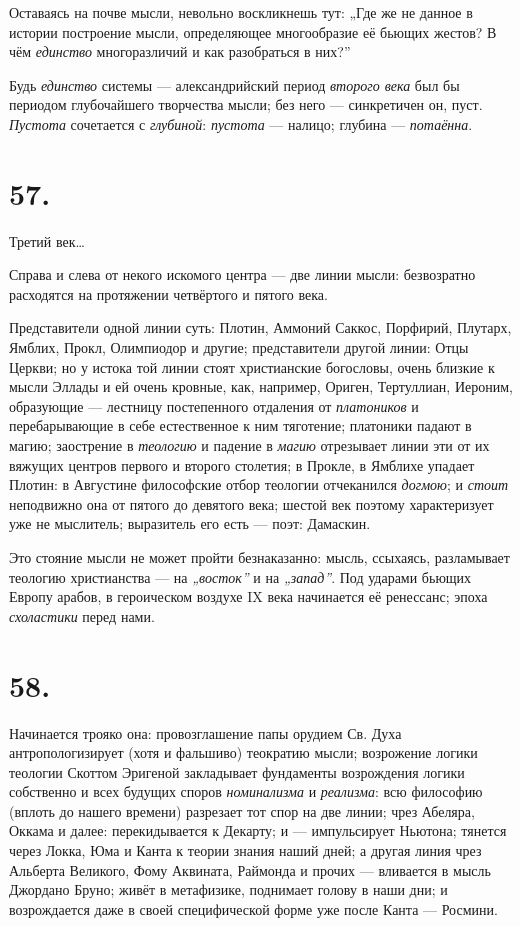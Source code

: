 \documentclass[12pt,a4paper,oneside]{book}
\begin{document}
Оставаясь на почве мысли, невольно воскликнешь тут: „Где же не данное в истории построение мысли, определяющее многообразие её бьющих жестов? В чём \emph{единство} многоразличий и как разобраться в них?”

Будь \emph{единство} системы — александрийский период \emph{второго века} был бы периодом глубочайшего творчества мысли; без него — синкретичен он, пуст. \emph{Пустота} сочетается с \emph{глубиной}: \emph{пустота} — налицо; глубина — \emph{потаённа}.

\section*{57.}

Третий век…

Справа и слева от некого искомого центра — две линии мысли: безвозратно расходятся на протяжении четвёртого и пятого века.

Представители одной линии суть: Плотин, Аммоний Саккос, Порфирий, Плутарх, Ямблих, Прокл, Олимпиодор и другие; представители другой линии: Отцы Церкви; но у истока той линии стоят христианские богословы, очень близкие к мысли Эллады и ей очень кровные, как, например, Ориген, Тертуллиан, Иероним, образующие — лестницу постепенного отдаления от \emph{платоников} и перебарывающие в себе естественное к ним тяготение; платоники падают в магию; заострение в \emph{теологию} и падение в \emph{магию} отрезывает линии эти от их вяжущих центров первого и второго столетия; в Прокле, в Ямблихе упадает Плотин: в Августине философские отбор теологии отчеканился \emph{догмою}; и \emph{стоит} неподвижно она от пятого до девятого века; шестой век поэтому характеризует уже не мыслитель; выразитель его есть — поэт: Дамаскин.

Это стояние мысли не может пройти безнаказанно: мысль, ссыхаясь, разламывает теологию христианства — на \emph{„восток”} и на \emph{„запад”}. Под ударами бьющих Европу арабов, в героическом воздухе IX века начинается её ренессанс; эпоха \emph{схоластики} перед нами.

\section*{58.}

Начинается трояко она: провозглашение папы орудием Св. Духа антропологизирует (хотя и фальшиво) теократию мысли; возрожение логики теологии Скоттом Эригеной закладывает фундаменты возрождения логики собственно и всех будущих споров \emph{номинализма} и \emph{реализма}: всю философию (вплоть до нашего времени) разрезает тот спор на две линии; чрез Абеляра, Оккама и далее: перекидывается к Декарту; и — импульсирует Ньютона; тянется через Локка, Юма и Канта к теории знания наший дней; а другая линия чрез Альберта Великого, Фому Аквината, Раймонда и прочих — вливается в мысль Джордано Бруно; живёт в метафизике, поднимает голову в наши дни; и возрождается даже в своей специфической форме уже после Канта — Росмини.
\end{document}

